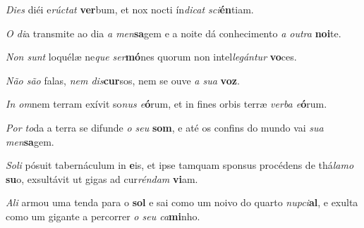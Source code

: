\begin{greenumerate}
  \setcounter{enumi}{1}


  \item \textit{Dies} diéi e\textit{rúctat} \textbf{ver}bum, {\GreStar} et nox nocti ín\textit{dicat sci}\textbf{én}\-tiam. 

  \switchcolumn\setcounter{enumi}{1}

  \item \textit{O di}a transmite ao dia \textit{a men}\textbf{sa}gem {\GreStar} e a noite dá conhecimento \textit{a outra} \textbf{noi}te. 

  \switchcolumn*


  \item \textit{Non sunt} loquélæ ne\textit{que ser}\textbf{mó}nes {\GreStar} quorum non intel\textit{legántur} \textbf{vo}ces. 

  \switchcolumn%

  \item \textit{Não são} falas, \textit{nem dis}\textbf{cur}sos, {\GreStar} nem se ouve \textit{a sua} \textbf{voz}. 

  \switchcolumn*


  \item \textit{In om}nem terram exívit so\textit{nus e}\textbf{ó}rum, {\GreStar} et in fines orbis terræ \textit{verba e}\textbf{ó}rum. 

  \switchcolumn%

  \item \textit{Por to}da a terra se difunde \textit{o seu} \textbf{som}, {\GreStar} e até os confins do mundo vai \textit{sua men}\textbf{sa}gem. 

  \switchcolumn*


  \item \textit{Soli} pósuit tabernáculum in \textbf{e}is, {\GreDagger} et ipse tamquam sponsus procédens de thá\textit{lamo} \textbf{su}o, {\GreStar} exsultávit ut gigas ad cur\textit{réndam} \textbf{vi}am. 

  \switchcolumn%

  \item \textit{Ali} armou uma tenda para o \textbf{sol} {\GreDagger} e sai como um noivo do quarto \textit{nupci}\textbf{al}, {\GreStar} e exulta como um gigante a percorrer \textit{o seu ca}\textbf{mi}nho. 


\end{greenumerate}
